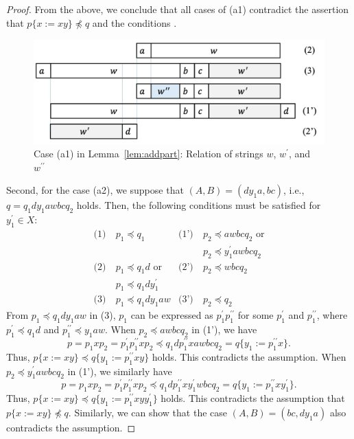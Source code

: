\begin{proof}
  From the above, we conclude that all cases of (a1) contradict the assertion that $p\{x := xy\} \not\preceq q$ and the conditions \TheConditionA.
  
  \begin{figure}[t]
    \begin{center}
      \includegraphics[scale=0.345]{figs/centerproof1.pdf}
      \caption{Case (a1) in Lemma~\ref{lem:addpart}: Relation of strings $w$, $w^{\prime}$, and $w^{\prime\prime}$}\label{fig:centerproof1}
    \end{center}
    \end{figure}

  Second, for the case (a2), we suppose that $(A, B) = (dy_{1}a, bc)$, i.e., $q = q_{1}dy_{1}awbcq_{2} $ holds.
  Then, the following conditions must be satisfied for $y_{1}^{\prime}\in X$:
  \begin{align*}
    \textrm{(1)}~& p_{1} \preceq q_{1} & \textrm{(1')}~& p_{2} \preceq awbcq_{2}\mbox{ or} \\
    & & & p_{2} \preceq y_{1}^{\prime}awbcq_{2}\\
    \textrm{(2)}~& p_{1} \preceq q_{1}d\mbox{ or}  & \textrm{(2')}~& p_{2} \preceq wbcq_{2}\\
    & p_{1} \preceq q_{1}dy_{1}^{\prime} & & \\
    \textrm{(3)}~& p_{1} \preceq q_{1}dy_{1}aw & \textrm{(3')}~& p_{2} \preceq q_{2}
  \end{align*}
  From $p_{1} \preceq q_{1}dy_{1}aw$ in (3), $p_{1}$ can be expressed as $p^{\prime}_{1}p^{\prime\prime}_{1}$ for some $p^{\prime}_{1}$ and $p^{\prime\prime}_{1}$, where $p^{\prime}_{1} \preceq q_{1}d$ and $p^{\prime\prime}_{1} \preceq y_{1}aw$.
  When $p_{2} \preceq awbcq_{2}$ in (1'), we have $$p=p_{1}xp_{2}=p^{\prime}_{1}p^{\prime\prime}_{1}xp_{2} \preceq q_{1}dp^{\prime\prime}_{1}xawbcq_{2}=q \{ y_{1}:=p^{\prime\prime}_{1}x \}.$$
  Thus, $p \{ x := xy \} \preceq q \{ y_{1}:=p^{\prime\prime}_{1}xy \}$ holds.
  This contradicts the assumption.
  When $p_{2} \preceq y_{1}^{\prime}awbcq_{2}$ in (1'), we similarly have $$p=p_{1}xp_{2}=p^{\prime}_{1}p^{\prime\prime}_{1}xp_{2} \preceq q_{1}dp^{\prime\prime}_{1}xy_{1}^{\prime}wbcq_{2}=q \{ y_{1}:=p^{\prime\prime}_{1}xy_{1}^{\prime} \}.$$
  Thus, $p \{ x := xy \} \preceq q \{ y_{1}:=p^{\prime\prime}_{1}xyy_{1}^{\prime} \}$ holds.
  This contradicts the assumption that $p \{ x := xy \} \not\preceq q$.
  Similarly, we can show that the case $(A, B) = (bc, dy_{1}a)$ also contradicts the assumption.
  

\end{proof}
